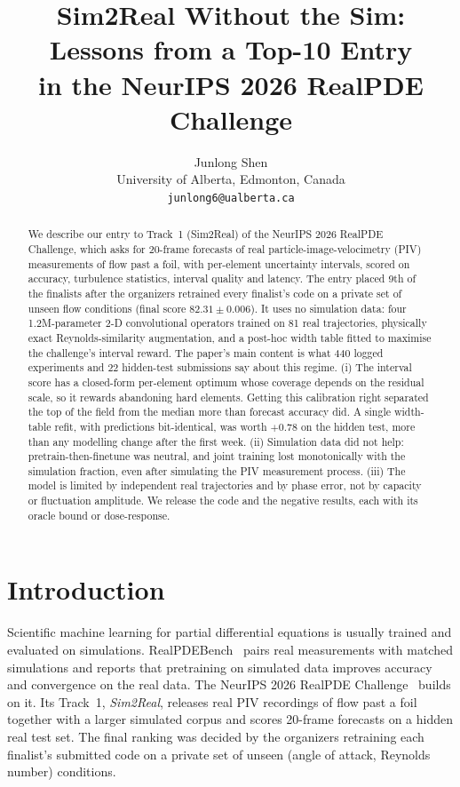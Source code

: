 \documentclass[10pt]{article}
\title{Sim2Real Without the Sim: Lessons from a Top-10 Entry\\in the NeurIPS 2026 RealPDE Challenge}
\author{Junlong Shen\\University of Alberta, Edmonton, Canada\\\texttt{junlong6@ualberta.ca}}
\date{}
\begin{document}
\maketitle

\begin{abstract}
We describe our entry to Track~1 (Sim2Real) of the NeurIPS 2026 RealPDE Challenge, which asks for 20-frame forecasts of real particle-image-velocimetry (PIV) measurements of flow past a foil, with per-element uncertainty intervals, scored on accuracy, turbulence statistics, interval quality and latency. The entry placed 9th of the finalists after the organizers retrained every finalist's code on a private set of unseen flow conditions (final score $82.31\pm0.006$). It uses no simulation data: four 1.2M-parameter 2-D convolutional operators trained on 81 real trajectories, physically exact Reynolds-similarity augmentation, and a post-hoc width table fitted to maximise the challenge's interval reward. The paper's main content is what 440 logged experiments and 22 hidden-test submissions say about this regime. (i) The interval score has a closed-form per-element optimum whose coverage depends on the residual scale, so it rewards abandoning hard elements. Getting this calibration right separated the top of the field from the median more than forecast accuracy did. A single width-table refit, with predictions bit-identical, was worth $+0.78$ on the hidden test, more than any modelling change after the first week. (ii) Simulation data did not help: pretrain-then-finetune was neutral, and joint training lost monotonically with the simulation fraction, even after simulating the PIV measurement process. (iii) The model is limited by independent real trajectories and by phase error, not by capacity or fluctuation amplitude. We release the code and the negative results, each with its oracle bound or dose-response.
\end{abstract}

\section{Introduction}

Scientific machine learning for partial differential equations is usually trained and evaluated on simulations. RealPDEBench~\citep{hu2026realpdebench} pairs real measurements with matched simulations and reports that pretraining on simulated data improves accuracy and convergence on the real data. The NeurIPS 2026 RealPDE Challenge~\citep{realpde2026competition} builds on it. Its Track~1, \emph{Sim2Real}, releases real PIV recordings of flow past a foil together with a larger simulated corpus and scores 20-frame forecasts on a hidden real test set. The final ranking was decided by the organizers retraining each finalist's submitted code on a private set of unseen (angle of attack, Reynolds number) conditions.
\end{document}
